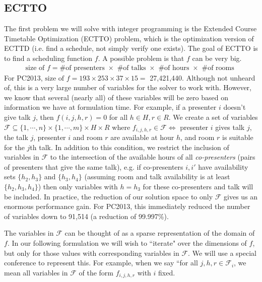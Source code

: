 \documentclass[]{article}
\theoremstyle{definition}
\theoremstyle{remark}
\numberwithin{equation}{section}
\begin{document}
\subsection{ECTTO}
The first problem we will solve with integer programming is the Extended Course Timetable Optimization (ECTTO) problem, which is the optimization version of ECTTD (i.e. find a schedule, not simply verify one exists). The goal of ECTTO is to find a scheduling function $f$. A possible problem is that $f$ can be very big.
\begin{gather*}
	\text{size of } f = \text{\# of presenters } \times \text{ \# of talks } \times \text{ \# of hours } \times \text{ \# of rooms }
\end{gather*}
For PC2013, $\text{size of } f = 193 \times 253 \times 37 \times 15 = $ 27,421,440. Although not unheard of, this is a very large number of variables for the solver to work with. However, we know that several (nearly all) of these variables will be zero based on information we have at formulation time. For example, if a presenter $i$ doesn't give talk $j$, then $f(i,j,h,r) = 0$ for all $h \in H, r \in R$. We create a set of variables $\mathcal F \subseteq \{1,\cdots,n\} \times \{1,\cdots,m\} \times H \times R$ where $f_{i,j,h,r} \in \mathcal F \iff $ presenter $i$ gives talk $j$, the talk $j$, presenter $i$ and room $r$ are available at hour $h$, and room $r$ is suitable for the $j$th talk. In addition to this condition, we restrict the inclusion of variables in $\mathcal F$ to the intersection of the available hours of all \emph{co-presenters} (pairs of presenters that give the same talk), e.g. if co-presenters $i,i'$ have availability sets $\{h_2,h_3\}$ and $\{h_3,h_4\}$ (assuming room and talk availability is at least $\{h_2, h_3, h_4\}$) then only variables with $h=h_3$ for these co-presenters and talk will be included. In practice, the reduction of our solution space to only $\mathcal F$ gives us an enormous performance gain. For PC2013, this immediately reduced the number of variables down to 91,514 (a reduction of 99.997\%).

The variables in $\mathcal F$ can be thought of as a sparse representation of the domain of $f$. In our following formulation we will wish to ``iterate" over the dimensions of $f$, but only for those values with corresponding variables in $\mathcal F$. We will use a special conference to represent this. For example, when we say ``for all $j,h,r \in \mathcal F_i$, we mean all variables in $\mathcal F$ of the form $f_{i,j,h,r}$ with $i$ fixed.
\end{document}
